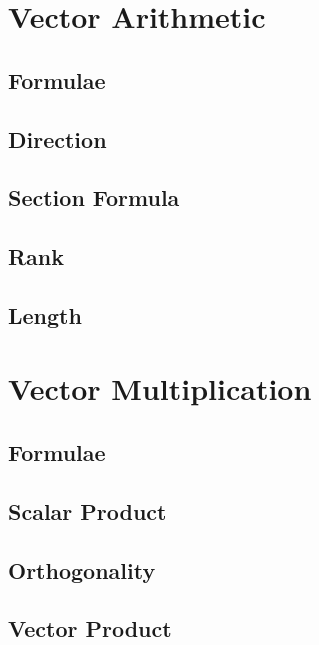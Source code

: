 \documentclass[journal]{IEEEtran}
\begin{document}
\newpage


\tableofcontents

\newpage
\onecolumn


\renewcommand{\thetable}{\theenumi}


\section{Vector Arithmetic}
\subsection{Formulae}

\subsection{Direction}

\subsection{Section Formula}

\subsection{Rank}

\subsection{Length}

%
\newpage
\section{Vector Multiplication}
\subsection{Formulae}

\subsection{Scalar Product}

\subsection{Orthogonality}

\subsection{Vector Product}

\end{document}
